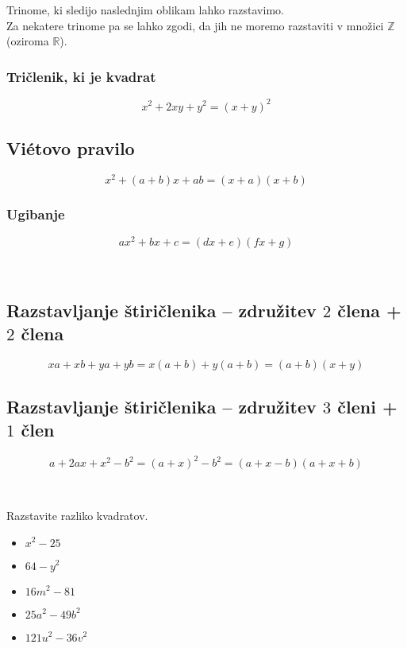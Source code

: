             
        Trinome, ki sledijo naslednjim oblikam lahko razstavimo. \\
        Za nekatere trinome pa se lahko zgodi, da jih ne moremo razstaviti v množici $\mathbb{Z}$ (oziroma $\mathbb{R}$).
        
        \subsubsection*{Tričlenik, ki je kvadrat}
            $$x^2+2xy+y^2=(x+y)^2$$
        

        \subsection*{Vi\'etovo pravilo}
        $$x^2+(a+b)x+ab=(x+a)(x+b)$$
    

        \subsubsection*{Ugibanje}
        $$ax^2+bx+c=(dx+e)(fx+g) $$
        
        
    ~\newline
        \subsection*{Razstavljanje štiričlenika -- združitev $2$ člena + $2$ člena}
        $$xa+xb+ya+yb=x(a+b)+y(a+b)=(a+b)(x+y)$$
    

        \subsection*{Razstavljanje štiričlenika -- združitev $3$ členi + $1$ člen}
        $$a+2ax+x^2-b^2=(a+x)^2-b^2=(a+x-b)(a+x+b)$$
            
    
        ~\newline
    
    
        
            \begin{naloga}
                Razstavite razliko kvadratov.
                \begin{itemize}
                    \item $x^2-25$ 
                    \item $64-y^2$ 
                    \item $16m^2-81$ 
                    \item $25a^2-49b^2$ 
                    \item $121u^2-36v^2$ 
                \end{itemize}
            \end{naloga}
        
